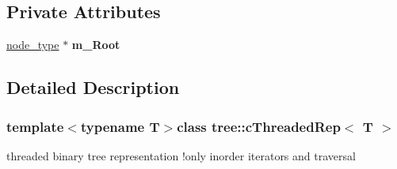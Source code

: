 \subsection*{\-Private \-Attributes}
\begin{DoxyCompactItemize}
\item 
\hypertarget{classtree_1_1cThreadedRep_ab973b2dff5006a341af704098731fe8e}{\hyperlink{structtree_1_1btree__threaded__node}{node\-\_\-type} $\ast$ {\bfseries m\-\_\-\-Root}}\label{classtree_1_1cThreadedRep_ab973b2dff5006a341af704098731fe8e}

\end{DoxyCompactItemize}


\subsection{\-Detailed \-Description}
\subsubsection*{template$<$typename T$>$class tree\-::c\-Threaded\-Rep$<$ T $>$}

threaded binary tree representation !only inorder iterators and traversal 

